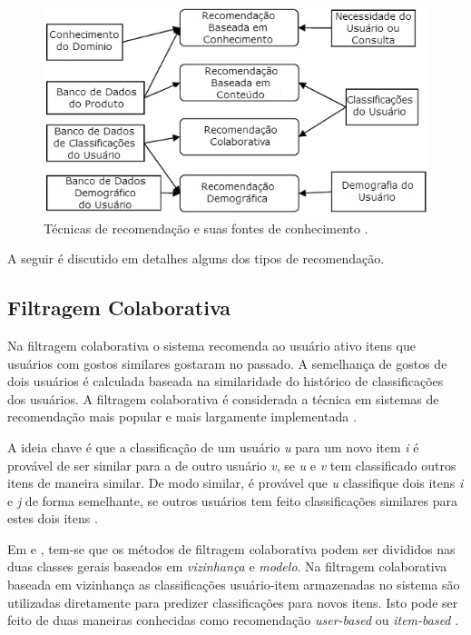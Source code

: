 \begin{figure}
	\centering
	\includegraphics[scale=0.8]{imagens/recommendation_techniques_knowledg_sources.png}
	\caption{Técnicas de recomendação e suas fontes de conhecimento \citep{Burke:2007:HWR:1768197.1768211}.}
	\label{fig:tec_recomendacao_fontes_conhecimento}
\end{figure} 

	A seguir é discutido em detalhes alguns dos tipos de recomendação.
	
\subsection{Filtragem Colaborativa}

Na filtragem colaborativa o sistema recomenda ao usuário ativo itens que usuários com gostos similares gostaram no passado. A semelhança de gostos de dois usuários é calculada baseada na similaridade do histórico de classificações dos usuários. A filtragem colaborativa é considerada a técnica em sistemas de recomendação mais popular e mais largamente implementada \citep{ricci2011recommender}.

A ideia chave é que a classificação de um usuário \textit{u} para um novo item \textit{i} é provável de ser similar para a de outro usuário \textit{v}, se \textit{u} e \textit{v} tem classificado outros itens de maneira similar. De modo similar, é provável que \textit{u} classifique dois itens \textit{i} e \textit{j} de forma semelhante, se outros usuários tem feito classificações similares para estes dois itens \citep{ricci2011recommender}.

Em \cite{Burke:2002:HRS:586321.586352} e \cite{Burke:2007:HWR:1768197.1768211}, tem-se que os métodos de filtragem colaborativa podem ser divididos nas duas classes gerais baseados em \textit{vizinhança} e \textit{modelo}. Na filtragem colaborativa baseada em vizinhança as classificações usuário-item armazenadas no sistema são utilizadas diretamente para predizer classificações para novos itens. Isto pode ser feito de duas maneiras conhecidas como recomendação \textit{user-based} ou \textit{item-based} \citep{ricci2011recommender}.

